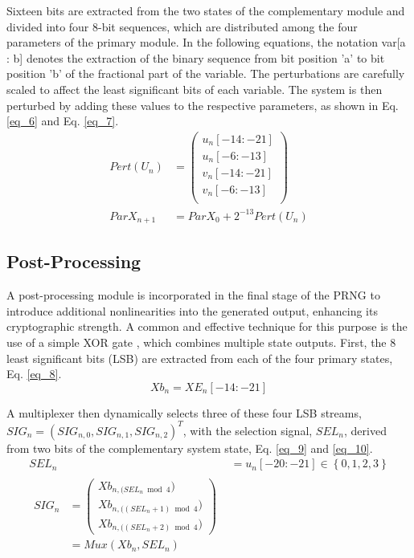 \documentclass[preprint, 12pt, sort&compress]{elsarticle}
\begin{document}
Sixteen bits are extracted from the two states of the complementary module and divided into four 8-bit sequences, which are distributed among the four parameters of the primary module. In the following equations, the notation var[a : b] denotes the extraction of the binary sequence from bit position 'a' to bit position 'b' of the fractional part of the variable. The perturbations are carefully scaled to affect the least significant bits of each variable. The system is then perturbed by adding these values to the respective parameters, as shown in Eq. \ref{eq_6} and Eq. \ref{eq_7}.
\begin{align}
\label{eq_6}
Pert(U_n) &=
\left(\begin{array}{l}
    u_n\left[-14:-21 \right]\\
    u_n\left[-6:-13 \right] \\
    v_n\left[-14:-21 \right] \\
    v_n\left[-6:-13 \right] \\
\end{array}\right)\\
\label{eq_7}
ParX_{n+1}&= ParX_0+2^{-13}Pert(U_n)
\end{align}

\subsection{Post-Processing}

A post-processing module is incorporated in the final stage of the PRNG to introduce additional nonlinearities into the generated output, enhancing its cryptographic strength. A common and effective technique for this purpose is the use of a simple XOR gate \cite{benkouider_novel_2024, dridi_design_2023, dridi_design_2022}, which combines multiple state outputs. First, the 8 least significant bits (LSB) are extracted from each of the four primary states, Eq. \ref{eq_8}.
\begin{equation}
Xb_{n} = XE_n\left[-14:-21 \right]
\label{eq_8}
\end{equation}

A multiplexer then dynamically selects three of these four LSB streams, $SIG_n = (SIG_{n,0}, SIG_{n,1}, SIG_{n,2})^T$, with the selection signal, $SEL_n$, derived from two bits of the complementary system state, Eq. \ref{eq_9} and \ref{eq_10}.
\begin{align}
\label{eq_9}
SEL_n &= u_n\left[-20:-21 \right] \in \left\{0,1,2,3\right\} \\
\label{eq_10}
\begin{split}
SIG_n &=
  \left(\begin{array}{l}
    Xb_{n, (SEL_n \bmod 4}) \\
    Xb_{n, ((SEL_n+1) \bmod 4}) \\
    Xb_{n, ((SEL_n+2) \bmod 4})  
  \end{array}\right)\\
&=Mux(Xb_n,SEL_n)
\end{split}
\end{align}
\end{document}
